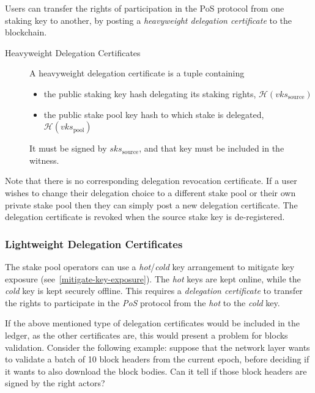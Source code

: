 \documentclass[11pt,a4paper]{article}
\begin{document}
Users can transfer the rights of participation in the PoS protocol from
one staking key to another, by posting a \emph{heavyweight delegation
certificate} to the blockchain.

\begin{description}
\item[Heavyweight Delegation Certificates]
A heavyweight delegation certificate is a tuple containing

\begin{itemize}
\item
  the public staking key hash delegating its staking rights,
  \(\mathcal{H}(vks_\text{source})\)
\item
  the public stake pool key hash to which stake is delegated,
  \(\mathcal{H}(vks_\text{pool})\) 
\end{itemize}

It must be signed by \(sks_\text{source}\), and that key must be
included in the witness.
\end{description}

Note that there is no corresponding delegation revocation certificate.
If a user wishes to change their delegation choice to a different stake
pool or their own private stake pool then they can simply post a new
delegation certificate. The delegation certificate is revoked when the
source stake key is de-registered.

\subsubsection{Lightweight Delegation Certificates}
\label{lightweight-delegation-certificates}

The stake pool operators can use a \emph{hot}/\emph{cold} key arrangement to
mitigate key exposure (see~\cref{mitigate-key-exposure}). The \emph{hot} keys
are kept online, while the \emph{cold} key is kept securely offline. This
requires a \emph{delegation certificate} to transfer the rights to participate
in the \emph{PoS} protocol from the \emph{hot} to the \emph{cold} key.

If the above mentioned type of delegation certificates would be included in the
ledger, as the other certificates are, this would present a problem for blocks
validation. Consider the following example: suppose that the network layer
wants to validate a batch of 10 block headers from the current epoch, before
deciding if it wants to also download the block bodies. Can it tell if those
block headers are signed by the right actors?
\end{document}
